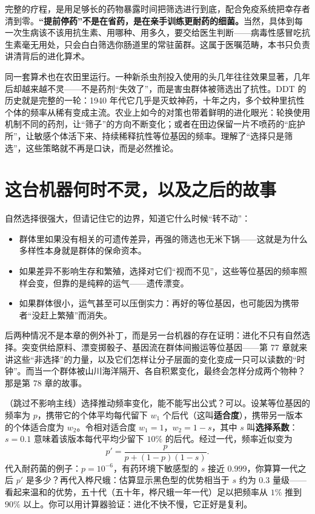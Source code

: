 完整的疗程，是用足够长的药物暴露时间把筛选进行到底，配合免疫系统把幸存者清到零。\textbf{“提前停药”不是在省药，是在亲手训练更耐药的细菌。}当然，具体到每一次生病该不该用抗生素、用哪种、用多久，要交给医生判断——病毒性感冒吃抗生素毫无用处，只会白白筛选你肠道里的常驻菌群。这属于医嘱范畴，本书只负责讲清背后的进化算术。

同一套算术也在农田里运行。一种新杀虫剂投入使用的头几年往往效果显著，几年后却越来越不灵——不是药剂“失效了”，而是害虫群体被筛选出了抗性。DDT 的历史就是完整的一轮：1940 年代它几乎是灭蚊神药，十年之内，多个蚊种里抗性个体的频率从稀有变成主流。农业上如今的对策也带着鲜明的进化眼光：轮换使用机制不同的药剂，让“筛子”的方向不断变化；或者在田边保留一片不喷药的“庇护所”，让敏感个体活下来、持续稀释抗性等位基因的频率。理解了“选择只是筛选”，这些策略就不再是口诀，而是必然推论。

\section{这台机器何时不灵，以及之后的故事}

自然选择很强大，但请记住它的边界，知道它什么时候“转不动”：

\begin{itemize}[itemsep=2pt]
\item 群体里如果没有相关的可遗传差异，再强的筛选也无米下锅——这就是为什么多样性本身就是群体的保命资本。
\item 如果差异不影响生存和繁殖，选择对它们“视而不见”，这些等位基因的频率照样会变，但靠的是纯粹的运气——遗传漂变。
\item 如果群体很小，运气甚至可以压倒实力：再好的等位基因，也可能因为携带者“没赶上繁殖”而消失。
\end{itemize}

后两种情况不是本章的例外补丁，而是另一台机器的存在证明：进化不只有自然选择。突变供给原料、漂变掷骰子、基因流在群体间搬运等位基因——第 77 章就来讲这些“非选择”的力量，以及它们怎样让分子层面的变化变成一只可以读数的“时钟”。而当一个群体被山川海洋隔开、各自积累变化，最终会怎样分成两个物种？那是第 78 章的故事。

\begin{tiaozhan}
（跳过不影响主线）选择推动频率变化，能不能写出公式？可以。设某等位基因的频率为 $p$，携带它的个体平均每代留下 $w_1$ 个后代（这叫\textbf{适合度}），携带另一版本的个体适合度为 $w_2$。令相对适合度 $w_1 = 1$，$w_2 = 1 - s$，其中 $s$ 叫\textbf{选择系数}：$s = 0.1$ 意味着该版本每代平均少留下 $10\%$ 的后代。经过一代，频率近似变为
\[
p' = \frac{p}{p + (1-p)(1-s)}.
\]
代入耐药菌的例子：$p = 10^{-6}$，有药环境下敏感型的 $s$ 接近 $0.999$，你算算一代之后 $p'$ 是多少？再代入桦尺蛾：估算显示黑色型的优势相当于 $s$ 约为 $0.3$ 量级——看起来温和的优势，五十代（五十年，桦尺蛾一年一代）足以把频率从 $1\%$ 推到 $90\%$ 以上。你可以用计算器验证：进化不快不慢，它正好是复利。
\end{tiaozhan}

